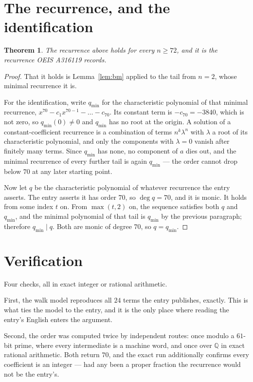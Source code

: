 \documentclass[11pt,a4paper]{article}
\theoremstyle{plain}
\newtheorem{theorem}{Theorem}
\theoremstyle{definition}
\begin{document}
\section{The recurrence, and the identification}

\begin{theorem}
The recurrence above holds for every $n\ge72$, and it is the recurrence OEIS A316119 records.
\end{theorem}

\begin{proof}
That it holds is Lemma~\ref{lem:bm} applied to the tail from $n=2$, whose minimal
recurrence it is.

For the identification, write $q_{\min}$ for the characteristic polynomial of that minimal
recurrence, $x^{70}-c_1x^{70-1}-\dots-c_{70}$. Its constant term is
$-c_{70}=-3840$, which is not zero, so $q_{\min}(0)\neq0$ and $q_{\min}$ has no
root at the origin. A solution of a constant-coefficient recurrence is a combination of terms
$n^{k}\lambda^{n}$ with $\lambda$ a root of its characteristic polynomial, and only the
components with $\lambda=0$ vanish after finitely many terms. Since $q_{\min}$ has none, no
component of $a$ dies out, and the minimal recurrence of every further tail is again
$q_{\min}$ --- the order cannot drop below $70$ at any later starting point.

Now let $q$ be the characteristic polynomial of whatever recurrence the entry asserts. The
entry asserts it has order $70$, so $\deg q=70$, and it is monic. It holds from some
index $t$ on. From $\max(t,2)$ on, the sequence satisfies both $q$ and $q_{\min}$, and
the minimal polynomial of that tail is $q_{\min}$ by the previous paragraph; therefore
$q_{\min}\mid q$. Both are monic of degree $70$, so $q=q_{\min}$.
\end{proof}

\section{Verification}

Four checks, all in exact integer or rational arithmetic.

First, the walk model reproduces all $24$ terms the entry publishes, exactly. This is
what ties the model to the entry, and it is the only place where reading the entry's English
enters the argument.

Second, the order was computed twice by independent routes: once modulo a $61$-bit prime, where
every intermediate is a machine word, and once over $\mathbb{Q}$ in exact rational arithmetic.
Both return $70$, and the exact run additionally confirms every coefficient is an integer
--- had any been a proper fraction the recurrence would not be the entry's.
\end{document}
